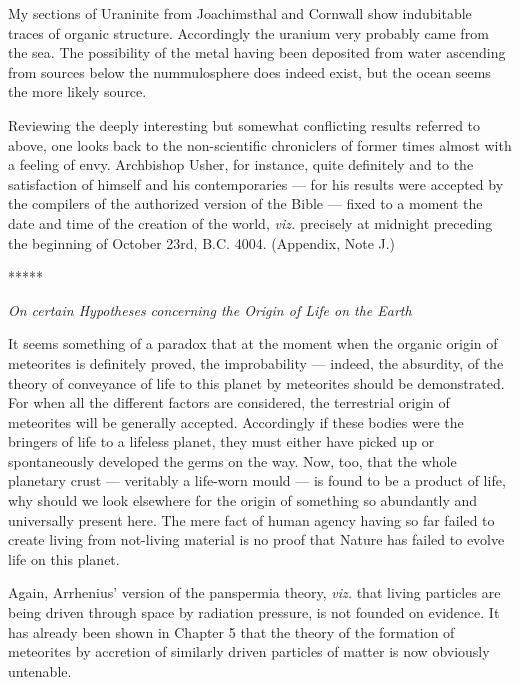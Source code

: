 \documentclass[a4paper, 12pt, oneside]{article}
\begin{document}
My sections of Uraninite from Joachimsthal and Cornwall show indubitable traces of organic structure. Accordingly the uranium very probably came from the sea. The possibility of the metal having been deposited from water ascending from sources below the nummulosphere does indeed exist, but the ocean seems the more likely source.

Reviewing the deeply interesting but somewhat conflicting results referred to above, one looks back to the non-scientific chroniclers of former times almost with a feeling of envy. Archbishop Usher, for instance, quite definitely and to the satisfaction of himself and his contemporaries --- for his results were accepted by the compilers of the authorized version of the Bible --- fixed to a moment the date and time of the creation of the world, \emph{viz.} precisely at midnight preceding the beginning of October 23rd, B.C. 4004. (Appendix, Note J.)

\centerline{*\hspace{15mm}*\hspace{15mm}*\hspace{15mm}*\hspace{15mm}*}
\bigskip

\centerline{\emph{On certain Hypotheses concerning the Origin of Life on the Earth}}

It seems something of a paradox that at the moment when the organic origin of meteorites is definitely proved, the improbability --- indeed, the absurdity, of the theory of conveyance of life to this planet by meteorites should be demonstrated. For when all the different factors are considered, the terrestrial origin of meteorites will be generally accepted. Accordingly if these bodies were the bringers of life to a lifeless planet, they must either have picked up or spontaneously developed the germs on the way. Now, too, that the whole planetary crust --- veritably a life-worn mould --- is found to be a product of life, why should we look elsewhere for the origin of something so abundantly and universally present here. The mere fact of human agency having so far failed to create living from not-living material is no proof that Nature has failed to evolve life on this planet.

Again, Arrhenius' version of the panspermia theory, \emph{viz.} that living particles are being driven through space by radiation pressure, is not founded on evidence. It has already been shown in Chapter 5 that the theory of the formation of meteorites by accretion of similarly driven particles of matter is now obviously untenable.
\end{document}
